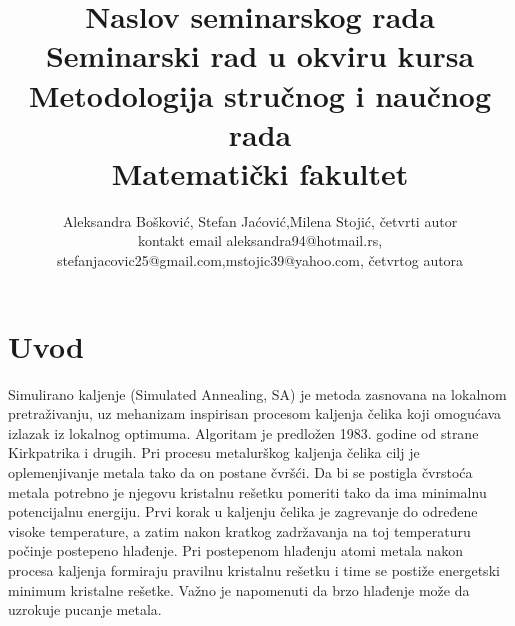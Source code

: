 \documentclass[a4paper]{article}
\begin{document}
\title{Naslov seminarskog rada\\ \small{Seminarski rad u okviru kursa\\Metodologija stručnog i naučnog rada\\ Matematički fakultet}}

\author{Aleksandra Bošković, Stefan Jaćović,Milena Stojić, četvrti autor\\ kontakt email aleksandra94@hotmail.rs, stefanjacovic25@gmail.com,mstojic39@yahoo.com, četvrtog autora}


\maketitle


\tableofcontents

\newpage

\section{Uvod}
\label{sec:uvod}

Simulirano kaljenje (Simulated Annealing, SA) je metoda zasnovana na lokalnom pretraživanju, uz mehanizam inspirisan procesom kaljenja čelika koji omogućava izlazak iz lokalnog optimuma. Algoritam je predložen 1983. godine od strane Kirkpatrika i drugih.
Pri procesu metalurškog kaljenja čelika cilj je oplemenjivanje metala tako da on postane čvršći. Da bi se postigla čvrstoća metala potrebno je njegovu kristalnu rešetku pomeriti tako da ima minimalnu potencijalnu energiju. Prvi korak u kaljenju čelika je zagrevanje do
određene visoke temperature, a zatim nakon kratkog zadržavanja na toj temperaturu počinje postepeno hlađenje. Pri postepenom hlađenju atomi metala nakon procesa kaljenja formiraju
pravilnu kristalnu rešetku i time se postiže energetski minimum kristalne rešetke. Važno je napomenuti da brzo hlađenje može da uzrokuje pucanje metala.
\end{document}
